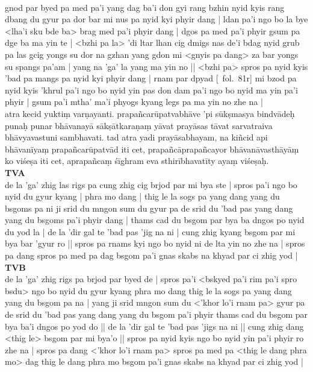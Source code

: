 \documentclass[12pt]{article}
\begin{document}
\textbf{\TVB}\\
gnod par byed pa med pa'i yang dag ba'i don gyi rang bzhin nyid kyis rang dbang du gyur pa dor bar mi nus pa nyid kyi phyir dang | ldan pa'i ngo bo la bye <lha'i sku bde ba> brag med pa'i phyir dang | dgos pa med pa'i phyir gsum pa dge ba ma yin te | <bzhi pa la> 'di ltar lhan cig dmigs nas de'i bdag nyid grub pa las gcig yongs su dor na gzhan yang gdon mi <gnyis pa dang> za bar yongs su spangs pa'am | yang na 'ga' la yang ma yin no || <bzhi pa> spros pa nyid kyis 'bad pa mangs pa nyid kyi phyir dang | rnam par dpyad [\TVB\ fol.\ 81r] mi bzod pa nyid kyis 'khrul pa'i ngo bo nyid yin pas don dam pa'i ngo bo nyid ma yin pa'i phyir | gsum pa'i mtha' ma'i phyogs kyang legs pa ma yin no zhe na |\\

atra kecid yuktiṃ varṇayanti. prapañcarūpatvabhāve\footnoteB{
	prapañcarūpatvabhāve] \emd\ (\TIB\ spros pa'i ngo bo nyid du gyur); prapañcarūpatvābhāve \MS\ \EDD
} 'pi sūkṣmasya bindvādeḥ punaḥ punar bhāvanayā sākṣātkaraṇaṃ yāvat prayāsas tāvat sarvatraiva bhāvyavastuni sambhavati. tad atra yadi prayāsabhayam, na kiñcid api bhāvanīyaṃ prapañcarūpatvād iti cet, prapañcāprapañcayor bhāvanāvasthāyāṃ ko viśeṣa iti cet, aprapañcaṃ śīghram eva sthirībhavatīty ayaṃ viśeṣaḥ.\\

\textbf{TVA}\\
de la 'ga' zhig las rigs pa cung zhig cig brjod par mi bya ste | spros pa'i ngo bo nyid du gyur kyang | phra mo dang | thig le la sogs pa yang dang yang du bsgoms pa ni ji srid du mngon sum du gyur pa de srid du 'bad pas yang dang yang du bsgoms pa'i phyir dang | thams cad du bsgom par bya ba dngos po nyid du yod la | de la 'dir gal te 'bad pas 'jig na ni | cung zhig kyang bsgom par mi bya bar 'gyur ro || spros pa rnams kyi ngo bo nyid ni de lta yin no zhe na | spros pa dang spros pa med pa dag bsgom pa'i gnas skabs na khyad par ci zhig yod |\\

\textbf{TVB}\\
de la 'ga' zhig rigs pa brjod par byed de | spros pa'i <bskyed pa'i rim pa'i spro bsdu> ngo bo nyid du gyur kyang phra mo dang thig le la sogs pa yang dang yang du bsgom pa na | yang ji srid mngon sum du <'khor lo'i rnam pa> gyur pa de srid du 'bad pas yang dang yang du bsgom pa'i phyir thams cad du bsgom par bya ba'i dngos po yod do || de la 'dir gal te 'bad pas 'jigs na ni || cung zhig dang <thig le> bsgom par mi bya'o || spros pa nyid kyis ngo bo nyid yin pa'i phyir ro zhe na | spros pa dang <'khor lo'i rnam pa> spros pa med pa <thig le dang phra mo> dag thig le dang phra mo bsgom pa'i gnas skabs na khyad par ci zhig yod |\\
\end{document}
